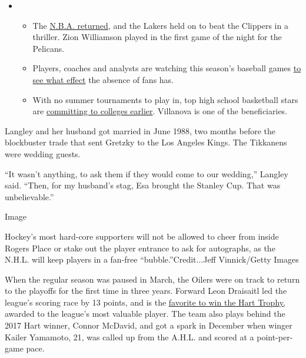 \begin{itemize}
\item
  \begin{itemize}
  \tightlist
  \item
    The
    \href{https://www.nytimes.com/2020/07/30/sports/basketball/clippers-lakers.html?action=click\&pgtype=Article\&state=default\&region=MAIN_CONTENT_2\&context=storylines_keepup}{N.B.A.
    returned}, and the Lakers held on to beat the Clippers in a
    thriller. Zion Williamson played in the first game of the night for
    the Pelicans.
  \item
    Players, coaches and analysts are watching this season's baseball
    games
    \href{https://www.nytimes.com/2020/07/31/sports/baseball/baseball-empty-stadiums-effects.html?action=click\&pgtype=Article\&state=default\&region=MAIN_CONTENT_2\&context=storylines_keepup}{to
    see what effect} the absence of fans has.
  \item
    With no summer tournaments to play in, top high school basketball
    stars are
    \href{https://www.nytimes.com/2020/07/30/sports/ncaabasketball/college-basketball-recruiting.html?action=click\&pgtype=Article\&state=default\&region=MAIN_CONTENT_2\&context=storylines_keepup}{committing
    to colleges earlier}. Villanova is one of the beneficiaries.
  \end{itemize}
\end{itemize}

Langley and her husband got married in June 1988, two months before the
blockbuster trade that sent Gretzky to the Los Angeles Kings. The
Tikkanens were wedding guests.

``It wasn't anything, to ask them if they would come to our wedding,''
Langley said. ``Then, for my husband's stag, Esa brought the Stanley
Cup. That was unbelievable.''

Image

Hockey's most hard-core supporters will not be allowed to cheer from
inside Rogers Place or stake out the player entrance to ask for
autographs, as the N.H.L. will keep players in a fan-free
``bubble.''Credit...Jeff Vinnick/Getty Images

When the regular season was paused in March, the Oilers were on track to
return to the playoffs for the first time in three years. Forward Leon
Draisaitl led the league's scoring race by 13 points, and is the
\href{https://www.nytimes.com/2020/07/27/sports/hockey/nhl-awards-restart-postseason.html}{favorite
to win the Hart Trophy,} awarded to the league's most valuable player.
The team also plays behind the 2017 Hart winner, Connor McDavid, and got
a spark in December when winger Kailer Yamamoto, 21, was called up from
the A.H.L. and scored at a point-per-game pace.

